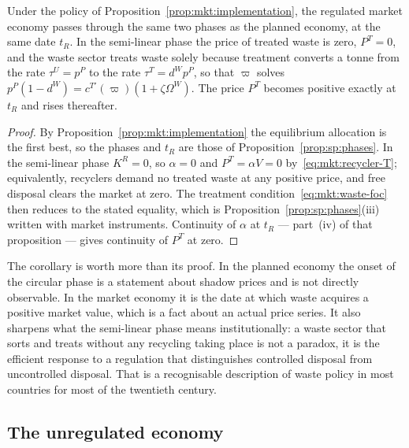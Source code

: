 \begin{corollary}\label{cor:mkt:phases}
Under the policy of Proposition~\ref{prop:mkt:implementation}, the regulated market economy passes
through the same two phases as the planned economy, at the same date $t_R$. In the semi-linear phase
the price of treated waste is zero, $P^T=0$, and the waste sector treats waste solely because
treatment converts a tonne from the rate $\tau^U=p^P$ to the rate $\tau^T=d^Wp^P$, so that
$\varpi$ solves $p^P\left(1-d^W\right)=c^{T\prime}\!\left(\varpi\right)\left(1+\zeta\Omega^W\right)$.
The price $P^T$ becomes positive exactly at $t_R$ and rises thereafter.
\end{corollary}

\begin{proof}
By Proposition~\ref{prop:mkt:implementation} the equilibrium allocation is the first best, so the
phases and $t_R$ are those of Proposition~\ref{prop:sp:phases}. In the semi-linear phase $K^R=0$, so
$\alpha=0$ and $P^T=\alpha V=0$ by~\eqref{eq:mkt:recycler-T}; equivalently, recyclers demand no treated
waste at any positive price, and free disposal clears the market at zero. The treatment
condition~\eqref{eq:mkt:waste-foc} then reduces to the stated equality, which is
Proposition~\ref{prop:sp:phases}(iii) written with market instruments. Continuity of $\alpha$ at $t_R$
--- part~(iv) of that proposition --- gives continuity of $P^T$ at zero.
\end{proof}

The corollary is worth more than its proof. In the planned economy the onset of the circular phase is
a statement about shadow prices and is not directly observable. In the market economy it is the date
at which waste acquires a positive market value, which is a fact about an actual price series. It also
sharpens what the semi-linear phase means institutionally: a waste sector that sorts and treats without
any recycling taking place is not a paradox, it is the efficient response to a regulation that
distinguishes controlled disposal from uncontrolled disposal. That is a recognisable description of
waste policy in most countries for most of the twentieth century.

\subsection{The unregulated economy}\label{sec:mkt:implementation:unregulated}

